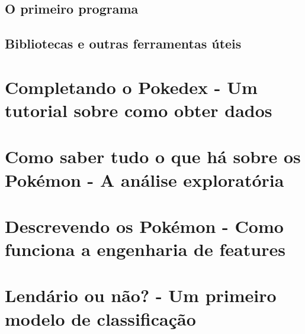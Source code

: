 \documentclass[]{book}
\begin{document}
\hypertarget{o-primeiro-programa}{%
\section{O primeiro programa}\label{o-primeiro-programa}}

\hypertarget{bibliotecas-e-outras-ferramentas-uxfateis}{%
\section{Bibliotecas e outras ferramentas úteis}\label{bibliotecas-e-outras-ferramentas-uxfateis}}

\hypertarget{completando-o-pokedex---um-tutorial-sobre-como-obter-dados}{%
\chapter{Completando o Pokedex - Um tutorial sobre como obter dados}\label{completando-o-pokedex---um-tutorial-sobre-como-obter-dados}}

\hypertarget{como-saber-tudo-o-que-huxe1-sobre-os-pokuxe9mon---a-anuxe1lise-exploratuxf3ria}{%
\chapter{Como saber tudo o que há sobre os Pokémon - A análise exploratória}\label{como-saber-tudo-o-que-huxe1-sobre-os-pokuxe9mon---a-anuxe1lise-exploratuxf3ria}}

\hypertarget{descrevendo-os-pokuxe9mon---como-funciona-a-engenharia-de-features}{%
\chapter{Descrevendo os Pokémon - Como funciona a engenharia de features}\label{descrevendo-os-pokuxe9mon---como-funciona-a-engenharia-de-features}}

\hypertarget{lenduxe1rio-ou-nuxe3o---um-primeiro-modelo-de-classificauxe7uxe3o}{%
\chapter{Lendário ou não? - Um primeiro modelo de classificação}\label{lenduxe1rio-ou-nuxe3o---um-primeiro-modelo-de-classificauxe7uxe3o}}


\end{document}
